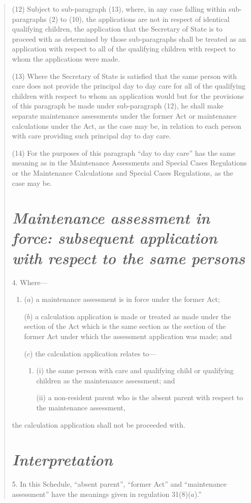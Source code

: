 \documentclass[12pt,a4paper]{article}
\begin{document}
\begin{quotation}
(12) Subject to sub-paragraph (13), where, in any case falling within sub-paragraphs (2) to (10), the applications are not in respect of identical qualifying children, the application that the Secretary of State is to proceed with as determined by those sub-paragraphs shall be treated as an application with respect to all of the qualifying children with respect to whom the applications were made.

(13) Where the Secretary of State is satisfied that the same person with care does not provide the principal day to day care for all of the qualifying children with respect to whom an application would but for the provisions of this paragraph be made under sub-paragraph (12), he shall make separate maintenance assessments under the former Act or maintenance calculations under the Act, as the case may be, in relation to each person with care providing such principal day to day care.

(14) For the purposes of this paragraph “day to day care” has the same meaning as in the Maintenance Assessments and Special Cases Regulations or the Maintenance Calculations and Special Cases Regulations, as the case may be.

\section*{\itshape Maintenance assessment in force: subsequent application with respect to the same persons}

4.  Where—
\begin{enumerate}\item[]
($a$) a maintenance assessment is in force under the former Act;

($b$) a calculation application is made or treated as made under the section of the Act which is the same section as the section of the former Act under which the assessment application was made; and

($c$) the calculation application relates to—
\begin{enumerate}\item[]
(i) the same person with care and qualifying child or qualifying children as the maintenance assessment; and

(ii) a non-resident parent who is the absent parent with respect to the maintenance assessment,
\end{enumerate}
\end{enumerate}
the calculation application shall not be proceeded with.

\section*{\itshape Interpretation}

5.  In this Schedule, “absent parent”, “former Act” and “maintenance assessment” have the meanings given in regulation 31(8)($a$).”
\end{quotation}
\end{document}
